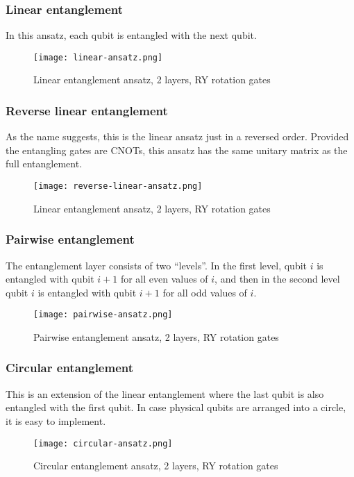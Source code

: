 \subsubsection{Linear entanglement}
In this ansatz, each qubit is entangled with the next qubit. 
\begin{figure}[H]
    \centering
    \texttt{[image: linear-ansatz.png]}
    \caption{Linear entanglement ansatz, 2 layers, RY rotation gates}
\end{figure}

\subsubsection{Reverse linear entanglement}
As the name suggests, this is the linear ansatz just in a reversed order. Provided the entangling gates are CNOTs, this ansatz has the same unitary matrix as the full entanglement. 
\begin{figure}[H]
    \centering
    \texttt{[image: reverse-linear-ansatz.png]}
    \caption{Linear entanglement ansatz, 2 layers, RY rotation gates}
\end{figure}

\subsubsection{Pairwise entanglement}
The entanglement layer consists of two ``levels''. In the first level, qubit $i$ is entangled with qubit $i+1$ for all even values of $i$, and then in the second level qubit $i$ is entangled with qubit $i+1$ for all odd values of $i$. 
\begin{figure}[H]
    \centering
    \texttt{[image: pairwise-ansatz.png]}
    \caption{Pairwise entanglement ansatz, 2 layers, RY rotation gates}
\end{figure}

\subsubsection{Circular entanglement}
This is an extension of the linear entanglement where the last qubit is also entangled with the first qubit. In case physical qubits are arranged into a circle, it is easy to implement.
\begin{figure}[H]
    \centering
    \texttt{[image: circular-ansatz.png]}
    \caption{Circular entanglement ansatz, 2 layers, RY rotation gates}
\end{figure}

